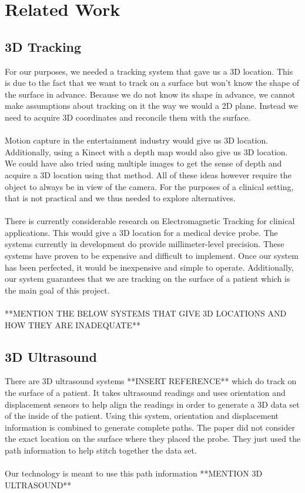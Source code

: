 \section{Related Work}

\subsection{3D Tracking}

For our purposes, we needed a tracking system that gave us a 3D location. This is due to the fact that we want to track on a surface but won't know the shape of the surface in advance. Because we do not know its shape in advance, we cannot make assumptions about tracking on it the way we would a 2D plane. Instead we need to acquire 3D coordinates and reconcile them with the surface. \\
\\
Motion capture in the entertainment industry would give us 3D location. Additionally, using a Kinect with a depth map would also give us 3D location. We could have also tried using multiple images to get the sense of depth and acquire a 3D location using that method. All of these ideas however require the object to always be in view of the camera. For the purposes of a clinical setting, that is not practical and we thus needed to explore alternatives. \\
\\
There is currently considerable research on Electromagnetic Tracking for clinical applications. This would give a 3D location for a medical device probe. The systems currently in development do provide millimeter-level precision. These systems have proven to be expensive and difficult to implement. Once our system has been perfected, it would be inexpensive and simple to operate. Additionally, our system guarantees that we are tracking on the surface of a patient which is the main goal of this project. \\
\\
**MENTION THE BELOW SYSTEMS THAT GIVE 3D LOCATIONS AND HOW THEY ARE INADEQUATE**

\subsection{3D Ultrasound}

There are 3D ultrasound systems **INSERT REFERENCE** which do track on the surface of a patient. It takes ultrasound readings and uses orientation and displacement sensors to help align the readings in order to generate a 3D data set of the inside of the patient. Using this system, orientation and displacement information is combined to generate complete paths. The paper did not consider the exact location on the surface where they placed the probe. They just used the path information to help stitch together the data set. \\
\\
Our technology is meant to use this path information 
**MENTION 3D ULTRASOUND**

